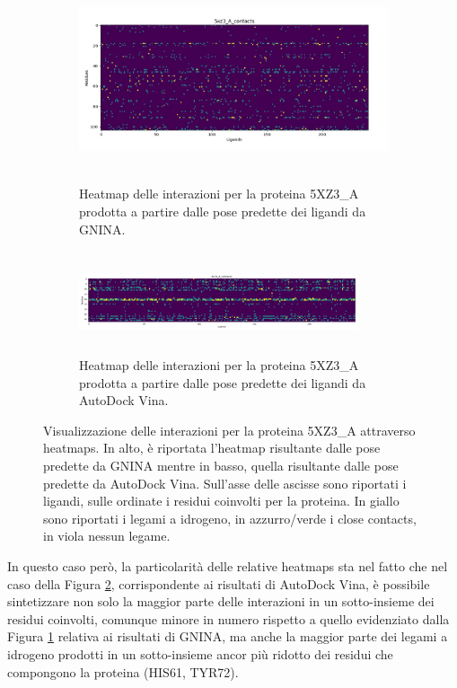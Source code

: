 \begin{figure}
    \centering
    \begin{subfigure}[b]{\textwidth}
        \centering
        \includegraphics[width=\textwidth, height=6cm]{images/heatmaps/heatmap_gnina_5xz3_a.jpg}
        \caption[]%
        {{\small Heatmap delle interazioni per la proteina 5XZ3\_A prodotta a partire dalle pose predette dei ligandi da GNINA.}}    
        \label{fig:heatmap_gnina_5xz3_a}
    \end{subfigure}
    \hfill
    \begin{subfigure}[b]{\textwidth}  
        \centering 
        \includegraphics[width=0.9\textwidth, height=3cm]{images/heatmaps/heatmap_vina_5xz3_a.jpg}
        \caption[]%
        {{\small Heatmap delle interazioni per la proteina 5XZ3\_A prodotta a partire dalle pose predette dei ligandi da AutoDock Vina.}}    
        \label{fig:heatmap_vina_5xz3_a}
    \end{subfigure}
    \caption[Visualizzazione delle heatmaps per la proteina 5XZ3\_A.]
    {\small Visualizzazione delle interazioni per la proteina 5XZ3\_A attraverso heatmaps. In alto, è riportata l'heatmap risultante dalle pose predette da GNINA mentre in basso, quella risultante dalle pose predette da AutoDock Vina. Sull'asse delle ascisse sono riportati i ligandi, sulle ordinate i residui coinvolti per la proteina. In giallo sono riportati i legami a idrogeno, in azzurro/verde i close contacts, in viola nessun legame. } 
    \label{fig:5xz3_a}
\end{figure}

In questo caso però, la particolarità delle relative heatmaps sta nel fatto che nel caso della Figura \ref{fig:heatmap_vina_5xz3_a}, corrispondente ai risultati di AutoDock Vina, è possibile sintetizzare non solo la maggior parte delle interazioni in un sotto-insieme dei residui coinvolti, comunque minore in numero rispetto a quello evidenziato dalla Figura \ref{fig:heatmap_gnina_5xz3_a} relativa ai risultati di GNINA, ma anche la maggior parte dei legami a idrogeno prodotti in un sotto-insieme ancor più ridotto dei residui che compongono la proteina (HIS61, TYR72).

